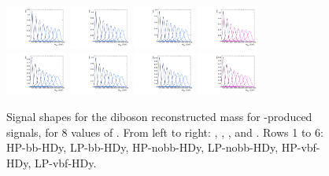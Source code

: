 \begin{figure}[htbp]
  \includegraphics[width=0.18\textwidth]{fig/2Dfit/templateSignalVsMX_fromDC_VBFGbuToWW_MVV_mu_HP_vbf_HDy.pdf}
  \includegraphics[width=0.18\textwidth]{fig/2Dfit/templateSignalVsMX_fromDC_VBFRadToWW_MVV_mu_HP_vbf_HDy.pdf}
  \includegraphics[width=0.18\textwidth]{fig/2Dfit/templateSignalVsMX_fromDC_VBFZprToWW_MVV_mu_HP_vbf_HDy.pdf}
  \includegraphics[width=0.18\textwidth]{fig/2Dfit/templateSignalVsMX_fromDC_VBFWprToWZ_MVV_mu_HP_vbf_HDy.pdf}\\
  \includegraphics[width=0.18\textwidth]{fig/2Dfit/templateSignalVsMX_fromDC_VBFGbuToWW_MVV_mu_LP_vbf_HDy.pdf}
  \includegraphics[width=0.18\textwidth]{fig/2Dfit/templateSignalVsMX_fromDC_VBFRadToWW_MVV_mu_LP_vbf_HDy.pdf}
  \includegraphics[width=0.18\textwidth]{fig/2Dfit/templateSignalVsMX_fromDC_VBFZprToWW_MVV_mu_LP_vbf_HDy.pdf}
  \includegraphics[width=0.18\textwidth]{fig/2Dfit/templateSignalVsMX_fromDC_VBFWprToWZ_MVV_mu_LP_vbf_HDy.pdf}\\
  \caption{
    Signal shapes for the diboson reconstructed mass \MVV for \VBF-produced signals, for 8 values of \MX.
    From left to right: \GBulktoWW, \RadtoWW, \ZprtoWW, and \WprtoWZ.
    Rows 1 to 6: HP-bb-HDy, LP-bb-HDy, HP-nobb-HDy, LP-nobb-HDy, HP-vbf-HDy, LP-vbf-HDy.
  }
  \label{fig:MVVShapes_VBF_HDy_Run2}
\end{figure}

